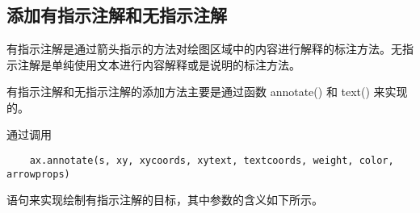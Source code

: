 \chapter{}
\section{添加有指示注解和无指示注解}
有指示注解是通过箭头指示的方法对绘图区域中的内容进行解释的标注方法。无指示注解是单纯使用文本进行内容解释或是说明的标注方法。

有指示注解和无指示注解的添加方法主要是通过函数 annotate() 和 text() 来实现的。

通过调用
\begin{verbatim}
    ax.annotate(s, xy, xycoords, xytext, textcoords, weight, color, arrowprops)
\end{verbatim}

语句来实现绘制有指示注解的目标，其中参数的含义如下所示。